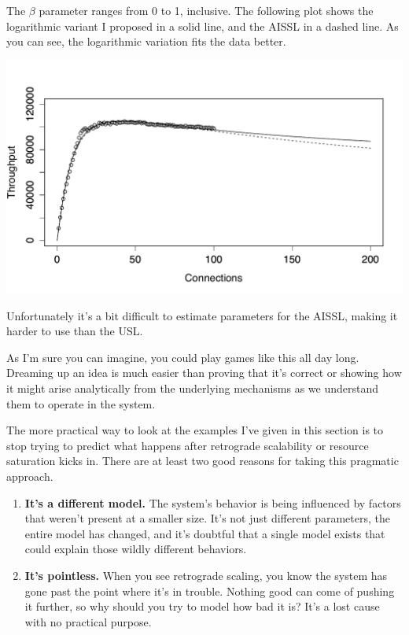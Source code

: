 \documentclass{vivid_layout}
\begin{document}
The $\beta$ parameter ranges from 0 to 1, inclusive. The following plot shows
the logarithmic variant I proposed in a solid line, and the AISSL in a dashed
line. As you can see, the logarithmic variation fits the data better.
\begin{center}
\includegraphics[width=.85\linewidth]{scalability/aissl}
\end{center}

Unfortunately it's a bit difficult to estimate parameters for the AISSL, making
it harder to use than the USL. 

As I'm sure you can imagine, you could play games like this all day long.
Dreaming up an idea is much easier than proving that it's correct or showing
how it might arise analytically from the underlying mechanisms as we understand
them to operate in the system.

The more practical way to look at the examples I've given in this section is to
stop trying to predict what happens after retrograde scalability or resource
saturation kicks in. There are at least two good reasons for taking this
pragmatic approach.

\begin{enumerate}
\item {\bfseries It's a different model.} The system's behavior is being
influenced by factors that weren't present at a smaller size. It's not just
different parameters, the entire model has changed, and it's doubtful that a
single model exists that could explain those wildly different behaviors.
\item {\bfseries It's pointless.}  When you see retrograde scaling, you know the
system has gone past the point where it's in trouble. Nothing good can come of
pushing it further, so why should you try to model how bad it is? It's a lost
cause with no practical purpose.
\end{enumerate}
\end{document}
